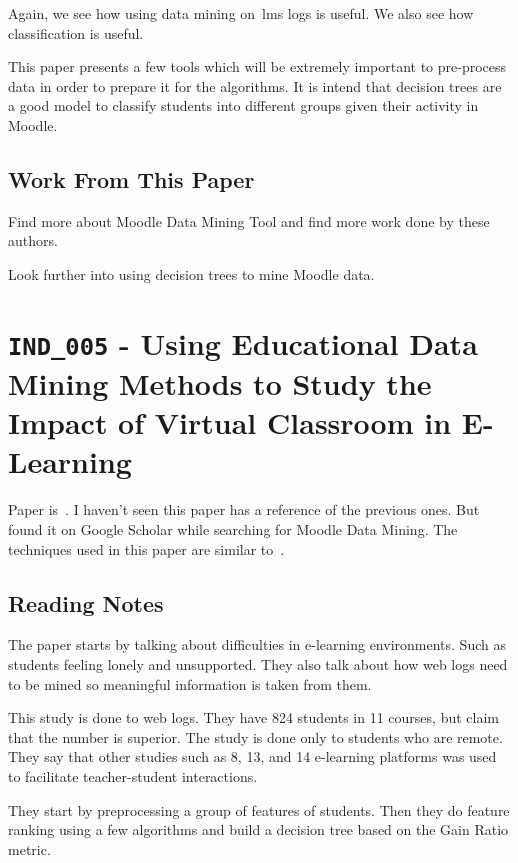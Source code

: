 Again, we see how using data mining on~\gls{lms} logs is useful. We also see
how classification is useful.

This paper presents a few tools which will be extremely important to
pre-process data in order to prepare it for the algorithms. It is intend that
decision trees are a good model to classify students into different groups
given their activity in Moodle.

\subsection{Work From This Paper}

Find more about Moodle Data Mining Tool and find more work done by these
authors.

Look further into using decision trees to mine Moodle data.

\section{\texttt{IND\_005} - Using Educational Data Mining Methods to Study the
Impact of Virtual Classroom in E-Learning}

Paper is~\cite{ind_005}. I haven't seen this paper has a reference of the
previous ones. But found it on Google Scholar while searching for Moodle Data
Mining. The techniques used in this paper are similar to~\cite{ind_002,
ind_004}.

\subsection{Reading Notes}

The paper starts by talking about difficulties in e-learning environments. Such
as students feeling lonely and unsupported. They also talk about how web logs
need to be mined so meaningful information is taken from them.

This study is done to web logs. They have 824 students in 11 courses, but claim
that the number is superior. The study is done only to students who are remote.
They say that other studies such as 8, 13, and 14 e-learning platforms was used
to facilitate teacher-student interactions.

They start by preprocessing a group of features of students. Then they do
feature ranking using a few algorithms and build a decision tree based on the
Gain Ratio metric.

